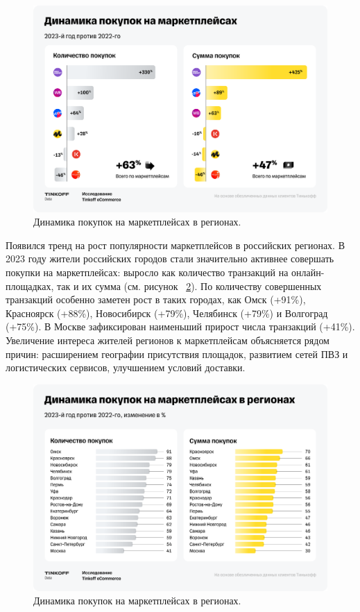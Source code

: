\documentclass[a4paper,12pt]{extarticle}
\begin{document}
\begin{figure}[hbtp]
	\centering
	\includegraphics[scale=0.3]{marketplaces-purchases-increased.png}
	\caption{Динамика покупок на маркетплейсах в регионах.}
	\label{fig:marketplaces-purchases-increased}
\end{figure} 

Появился тренд на рост популярности маркетплейсов в российских регионах. В 2023 году жители российских городов стали значительно активнее совершать покупки на маркетплейсах: выросло как количество транзакций на онлайн-площадках, так и их сумма (см. рисунок ~\ref{fig:marketplaces-regions}). По количеству совершенных транзакций особенно заметен рост в таких городах, как Омск (+91\%), Красноярск (+88\%), Новосибирск (+79\%), Челябинск (+79\%) и Волгоград (+75\%). В Москве зафиксирован наименьший прирост числа транзакций (+41\%). Увеличение интереса жителей регионов к маркетплейсам объясняется рядом причин: расширением географии присутствия площадок, развитием сетей ПВЗ и логистических сервисов, улучшением условий доставки.

\begin{figure}[hbtp]
	\centering
	\includegraphics[scale=0.3]{marketplaces-regions.png}
	\caption{Динамика покупок на маркетплейсах в регионах.}
	\label{fig:marketplaces-regions}
\end{figure}  
\end{document}
